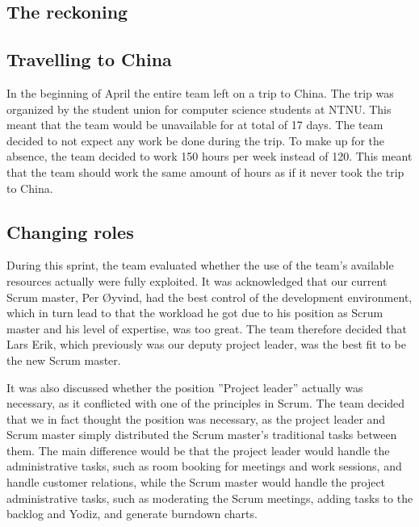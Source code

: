 \subsection{The reckoning}


\subsection{Travelling to China}
In the beginning of April the entire team left on a trip to China. The trip was organized by the student union for computer science students at NTNU. This meant that the team would be unavailable for at total of 17 days. The team decided to not expect any work be done during the trip. To make up for the absence, the team decided to work 150 hours per week instead of 120. This meant that the team should work the same amount of hours as if it never took the trip to China.

\subsection{Changing roles}
\label{sec:unbalancedWorkload}
During this sprint, the team evaluated whether the use of the team's available resources actually were fully exploited. It was acknowledged that our current Scrum master, Per Øyvind, had the best control of the development environment, which in turn lead to that the workload he got due to his position as Scrum master and his level of expertise, was too great. The team therefore decided that Lars Erik, which previously was our deputy project leader, was the best fit to be the new Scrum master.

It was also discussed whether the position ''Project leader'' actually was necessary, as it conflicted with one of the principles in Scrum. The team decided that we in fact thought the position was necessary, as the project leader and Scrum master simply distributed the Scrum master's traditional tasks between them. The main difference would be that the project leader would handle the administrative tasks, such as room booking for meetings and work sessions, and handle customer relations, while the Scrum master would handle the project administrative tasks, such as moderating the Scrum meetings, adding tasks to the backlog and Yodiz, and generate burndown charts.